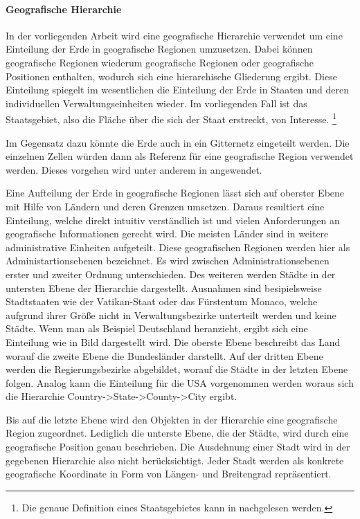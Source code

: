 		\paragraph*{Geografische Hierarchie}
		In der vorliegenden Arbeit wird eine geografische Hierarchie verwendet um eine Einteilung der Erde in geografische Regionen umzusetzen.
		Dabei können geografische Regionen wiederum geografische Regionen oder geografische Positionen enthalten, wodurch sich eine hierarchische Gliederung ergibt.
		Diese Einteilung spiegelt im wesentlichen die Einteilung der Erde in Staaten und deren individuellen Verwaltungseinheiten wieder.
		Im vorliegenden Fall ist das Staatsgebiet, also die Fläche über die sich der Staat erstreckt, von Interesse. \footnote{Die genaue Definition eines Staatsgebietes kann in \cite{jellinek1921} nachgelesen werden.} 

		Im Gegensatz dazu könnte die Erde auch in ein Gitternetz eingeteilt werden. 
		Die einzelnen Zellen würden dann als Referenz für eine geografische Region verwendet werden.
		Dieses vorgehen wird unter anderem in \cite{Serdyukov2009} angewendet.

		Eine Aufteilung der Erde in geografische Regionen lässt sich auf oberster Ebene mit Hilfe von Ländern und deren Grenzen umsetzen. 
		Daraus resultiert eine Einteilung, welche direkt intuitiv verständlich ist und vielen Anforderungen an geografische Informationen gerecht wird.
		Die meisten Länder sind in weitere administrative Einheiten aufgeteilt.
		Diese geografischen Regionen werden hier als Administartionsebenen bezeichnet.
		Es wird zwischen Administrationsebenen erster und zweiter Ordnung unterschieden. 
		Des weiteren werden Städte in der untersten Ebene der Hierarchie dargestellt.
		Ausnahmen sind besipielsweise Stadtstaaten wie der Vatikan-Staat oder das Fürstentum Monaco, welche aufgrund ihrer Größe nicht in Verwaltungsbezirke unterteilt werden und keine Städte.
		Wenn man als Beispiel Deutschland heranzieht, ergibt sich eine Einteilung wie in Bild  dargestellt wird.
		Die oberste Ebene beschreibt das Land worauf die zweite Ebene die Bundesländer darstellt.
		Auf der dritten Ebene werden die Regierungsbezirke abgebildet, worauf die Städte in der letzten Ebene folgen. 
		Analog kann die Einteilung für die USA vorgenommen werden woraus sich die Hierarchie Country->State->County->City ergibt.

		Bis auf die letzte Ebene wird den Objekten in der Hierarchie eine geografische Region zugeordnet. 
		Lediglich die unterste Ebene, die der Städte, wird durch eine geografische Position genau beschrieben. 
		Die Ausdehnung einer Stadt wird in der gegebenen Hierarchie also nicht berücksichtigt. 
		Jeder Stadt werden als konkrete geografische Koordinate in Form von Längen- und Breitengrad repräsentiert. 

